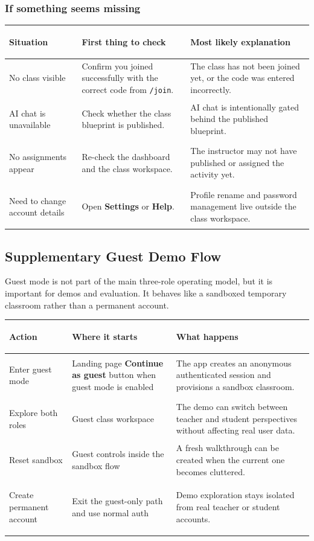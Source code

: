 \documentclass[11pt,a4paper]{article}
\begin{document}
\subsubsection*{If something seems missing}

\begin{table}[H]
\centering
\small
\begin{tabularx}{\textwidth}{>{\bfseries\raggedright\arraybackslash}p{3.1cm}>{\raggedright\arraybackslash}p{4.8cm}X}
\toprule
Situation & First thing to check & Most likely explanation \\
\midrule
No class visible & Confirm you joined successfully with the correct code from \texttt{/join}. & The class has not been joined yet, or the code was entered incorrectly. \\
AI chat is unavailable & Check whether the class blueprint is published. & AI chat is intentionally gated behind the published blueprint. \\
No assignments appear & Re-check the dashboard and the class workspace. & The instructor may not have published or assigned the activity yet. \\
Need to change account details & Open \textbf{Settings} or \textbf{Help}. & Profile rename and password management live outside the class workspace. \\
\bottomrule
\end{tabularx}
\end{table}

\subsection{Supplementary Guest Demo Flow}

Guest mode is not part of the main three-role operating model, but it is important for demos and
evaluation. It behaves like a sandboxed temporary classroom rather than a permanent account.

\begin{table}[H]
\centering
\small
\begin{tabularx}{\textwidth}{>{\bfseries\raggedright\arraybackslash}p{2.7cm}>{\raggedright\arraybackslash}p{3.8cm}X}
\toprule
Action & Where it starts & What happens \\
\midrule
Enter guest mode & Landing page \textbf{Continue as guest} button when guest mode is enabled & The app creates an anonymous authenticated session and provisions a sandbox classroom. \\
Explore both roles & Guest class workspace & The demo can switch between teacher and student perspectives without affecting real user data. \\
Reset sandbox & Guest controls inside the sandbox flow & A fresh walkthrough can be created when the current one becomes cluttered. \\
Create permanent account & Exit the guest-only path and use normal auth & Demo exploration stays isolated from real teacher or student accounts. \\
\bottomrule
\end{tabularx}
\end{table}
\end{document}

